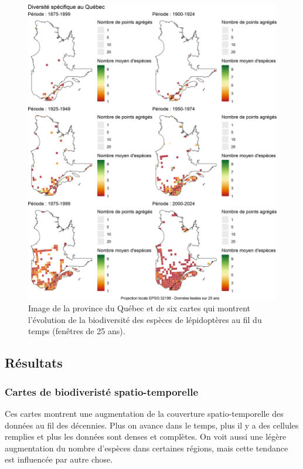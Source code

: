 \documentclass[9pt,twocolumn,twoside,]{pnas-new}
\begin{document}
\begin{figure}

\includegraphics[width=1\linewidth]{../Figures_analyse/cartes_combinees} \hfill{}

\caption{Image de la province du Québec et de six cartes qui montrent l'évolution de la biodiversité des espèces de lépidoptères au fil du temps (fenêtres de 25 ans).}\label{fig:fig_cartes_combinees, fullpage-figure}
\end{figure}

\subsection{\texorpdfstring{\textbf{Résultats}}{Résultats}}\label{ruxe9sultats}

\subsubsection{Cartes de biodiveristé
spatio-temporelle}\label{cartes-de-biodiveristuxe9-spatio-temporelle-1}

Ces cartes montrent une augmentation de la couverture spatio-temporelle
des données au fil des décennies. Plus on avance dans le temps, plus il
y a des cellules remplies et plus les données sont denses et complètes.
On voit aussi une légère augmentation du nombre d'espèces dans certaines
régions, mais cette tendance est influencée par autre chose.
\end{document}
